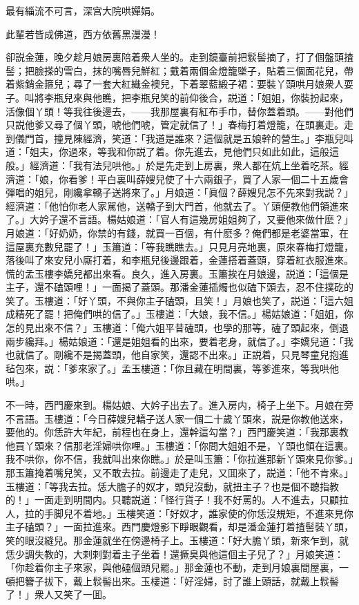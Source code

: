 \begin{myquote}
最有緇流不可言，深宫大院哄嬋娟。

此輩若皆成佛道，西方依舊黑漫漫！
\end{myquote}

卻説金蓮，晚夕趁月娘房裏陪着衆人坐的。走到鏡臺前把䯼髻摘了，打了個盤頭揸髻；把臉搽的雪白，抹的嘴唇兒鮮紅；戴着兩個金燈籠墜子，貼着三個面花兒，帶着紫銷金箍兒；尋了一套大紅織金襖兒，下着翠藍緞子裙：要裝丫頭哄月娘衆人耍子。叫將李瓶兒來與他瞧，把李瓶兒笑的前仰後合，説道：「姐姐，你裝扮起來，活像個丫頭！等我往後邊去，——我那屋裏有紅布手巾，替你蓋着頭。——對他們只説他爹又尋了個丫頭，唬他們唬，管定就信了！」春梅打着燈籠，在頭裏走。走到儀門首，撞見陳經濟，笑道：「我道是誰來？這個就是五娘幹的營生。」李瓶兒叫道：「姐夫，你過來，等我和你説了着。你先進去，見他們只如此如此，這般這般。」經濟道：「我有法兒哄他。」於是先走到上房裏，衆人都在炕上坐着吃茶。經濟道：「娘，你看爹！平白裏叫薛嫂兒使了十六兩銀子，買了人家一個二十五歲會彈唱的姐兒，剛纔拿轎子送將來了。」月娘道：「眞個？薛嫂兒怎不先來對我説？」經濟道：「他怕你老人家駡他，送轎子到大門首，他就去了。丫頭便教他們領進來了。」大妗子還不言語。楊姑娘道：「官人有這幾房姐姐夠了，又要他來做什麽？」月娘道：「好奶奶，你禁的有錢，就買一百個，有什麽多？俺們都是老婆當軍，在這屋裏充數兒罷了！」玉簫道：「等我瞧瞧去。」只見月亮地裏，原來春梅打燈籠，落後叫了來安兒小廝打着，和李瓶兒後邊跟着，金蓮搭着蓋頭，穿着紅衣服進來。慌的孟玉樓李嬌兒都出來看。良久，進入房裏。玉簫挨在月娘邊，説道：「這個是主子，還不磕頭哩！」一面揭了蓋頭。那潘金蓮插燭也似磕下頭去，忍不住撲矻的笑了。玉樓道：「好丫頭，不與你主子磕頭，且笑！」月娘也笑了，説道：「這六姐成精死了罷！把俺們哄的信了。」玉樓道：「大娘，我不信。」楊姑娘道：「姐姐，你怎的見出來不信？」玉樓道：「俺六姐平昔磕頭，也學的那等，磕了頭起來，倒退兩步纔拜。」楊姑娘道：「還是姐姐看的出來，要着老身，就信了。」李嬌兒道：「我也就信了。剛纔不是揭蓋頭，他自家笑，還認不出來。」正説着，只見琴童兒抱進毡包來，説：「爹來家了。」孟玉樓道：「你且藏在明間裏，等爹進來，等我哄他哄。」

不一時，西門慶來到。楊姑娘、大妗子出去了。進入房内，椅子上坐下。月娘在旁不言語。玉樓道：「今日薛嫂兒轎子送人家一個二十歲丫頭來，説是你教他送來，要他的。你恁許大年紀，前程也在身上，還幹這勾當？」西門慶笑道：「我那裏教他買丫頭來？信那老淫婦哄你哩。」玉樓道：「你問大姐姐不是，丫頭也領在這裏。我不哄你，你不信，我就叫出來你瞧。」於是叫玉簫：「你拉進那新丫頭來見你爹。」那玉簫掩着嘴兒笑，又不敢去拉。前邊走了走兒，又囬來了，説道：「他不肯來。」玉樓道：「等我去拉。恁大膽子的奴才，頭兒沒動，就扭主子？也是個不聽指教的！」一面走到明間内。只聽説道：「怪行貨子！我不好罵的。人不進去，只顧拉人，拉的手脚兒不着地。」玉樓笑道：「好奴才，誰家使的你恁沒規矩，不進來見你主子磕頭？」一面拉進來。西門慶燈影下睜眼觀看，却是潘金蓮打着揸髻裝丫頭，笑的眼沒縫兒。那金蓮就坐在傍邊椅子上。玉樓道：「好大膽丫頭，新來乍到，就恁少調失教的，大剌剌對着主子坐着！還撅臭與他這個主子兒了？」月娘笑道：「你趁着你主子來家，與他磕個頭兒罷。」那金蓮也不動，走到月娘裏間屋裏，一頓把簪子拔下，戴上䯼髻出來。玉樓道：「好淫婦，討了誰上頭話，就戴上䯼髻了！」衆人又笑了一囬。

